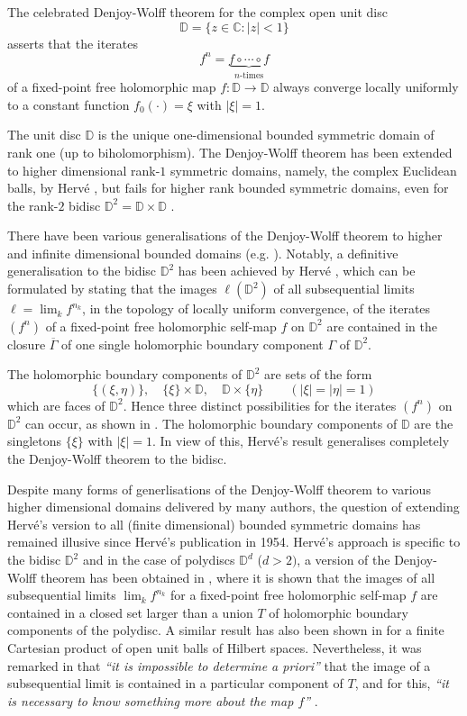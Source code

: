 \documentclass[12pt, twoside]{article}
\theoremstyle{definition}
\numberwithin{equation}{section}
\begin{document}
The celebrated Denjoy-Wolff theorem \cite{d,w}  for the complex open unit disc
$$\mathbb{D}=\{z\in \mathbb{C}: |z|<1\}$$
 asserts that the iterates $$f^n=\underbrace{f \circ \cdots \circ f}_{\mbox{$n$-times}}$$ of a fixed-point free
holomorphic map $f: \mathbb{D}\longrightarrow \mathbb{D}$ always converge locally uniformly
to a constant function $f_0(\cdot)=\xi$ with $|\xi|=1$.

The unit disc $\mathbb{D}$ is
the unique one-dimensional bounded symmetric domain of  rank one (up to biholomorphism).
The Denjoy-Wolff  theorem has been extended to higher dimensional
rank-$1$ symmetric domains, namely, the complex Euclidean balls, by Herv\'e \cite{h}, but fails for higher rank bounded symmetric domains,
even for the rank-$2$  bidisc $\mathbb{D}^2= \mathbb{D}\times \mathbb{D}$ \cite{h1}.


There have been various  generalisations of the Denjoy-Wolff theorem to higher and infinite dimensional bounded
domains (e.g. \cite{ab,lie, chulevico,rs}).
 Notably, a definitive generalisation to the bidisc $\mathbb{D}^2$ has been achieved by Herv\'e \cite{h1},
which can be formulated by stating that the images $\ell(\mathbb{D}^2)$ of all subsequential limits $\ell = \lim_k f^{n_k}$,
in the topology of locally uniform convergence,
of the iterates $(f^n)$  of a fixed-point free holomorphic self-map $f$ on $\mathbb{D}^2$ are contained in the
closure $\overline \Gamma$ of one single holomorphic boundary component $\Gamma$ of $\mathbb{D}^2$.

The holomorphic boundary components of $\mathbb{D}^2$ are sets of the form
$$\{(\xi,\eta)\}, \quad \{\xi\} \times {\mathbb{D}}, \quad {\mathbb{D}}\times \{\eta\}\qquad(|\xi|=|\eta|=1)$$
which are faces of $\mathbb{D}^2$.
Hence three distinct possibilities for the iterates $(f^n)$ on $\mathbb{D}^2$ can occur, as shown in \cite{h1}.
The holomorphic boundary components of $\mathbb{D}$ are the singletons $\{\xi\}$ with $|\xi|=1$. In view of this,
Herv\'e's result  generalises completely the Denjoy-Wolff theorem to the bidisc.

Despite many forms of generlisations of the Denjoy-Wolff theorem
to various higher dimensional domains delivered by many authors, the question
of extending Herv\'e's version to all (finite dimensional) bounded symmetric domains has remained illusive
since Herv\'e's publication \cite{h1} in 1954.
 Herv\'e's approach is specific to the bidisc $\mathbb{D}^2$ and in the case of polydiscs $\mathbb{D}^d$ ($d>2)$,
 a version of the Denjoy-Wolff theorem
 has been obtained in \cite{ab}, where it is shown that the images of all subsequential limits $\lim_k f^{n_k}$ for a fixed-point free
 holomorphic self-map $f$ are contained in a closed set larger than a union $T$ of holomorphic boundary components
 of the polydisc.  A similar result has also been shown in \cite{cr} for a finite Cartesian product of open unit balls of Hilbert spaces.
Nevertheless, it was  remarked in \cite{ab}  that {\it ``it is impossible to determine a priori''} that
 the image of a subsequential limit is contained in a particular
  component of $T$, and for this, {\it ``it is necessary to know something more about the map $f$''} .
\end{document}
